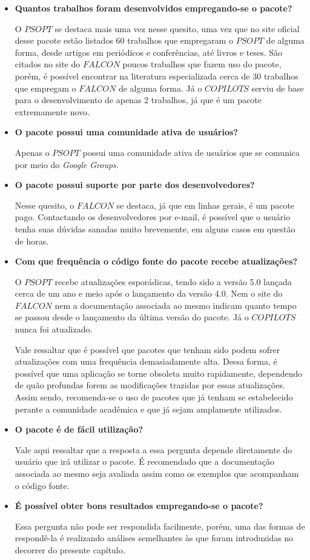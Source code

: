 \begin{itemize}
	\item \textbf{Quantos trabalhos foram desenvolvidos empregando-se o pacote? }
	
	O $ PSOPT $ se destaca mais uma vez nesse quesito, uma vez que no site oficial desse pacote estão listados 60 trabalhos que empregaram o $ PSOPT $ de alguma forma, desde artigos em periódicos e conferências, até livros e teses. São citados no site do $ FALCON $ poucos trabalhos que fazem uso do pacote, porém, é possível encontrar na literatura especializada cerca de 30 trabalhos que empregam o $ FALCON $ de alguma forma. Já o $ COPILOTS $ serviu de base para o desenvolvimento de apenas 2 trabalhos, já que é um pacote extremamente novo. 
	
	\item \textbf{O pacote possui uma comunidade ativa de usuários? }
	
	Apenas o $ PSOPT $ possui uma comunidade ativa de usuários que se comunica por meio do \textit{Google Groups}.
	
	\item \textbf{O pacote possui suporte por parte dos desenvolvedores?}
	
	Nesse quesito, o $ FALCON $ se destaca, já que em linhas gerais, é um pacote pago. Contactando os desenvolvedores por e-mail, é possível que o usuário tenha suas dúvidas sanadas muito brevemente, em alguns casos em questão de horas.
	
	\item \textbf{Com que frequência o código fonte do pacote recebe atualizações?}
	
	O $ PSOPT $ recebe atualizações esporádicas, tendo sido a versão 5.0 lançada cerca de um ano e meio após o lançamento da versão 4.0. Nem o site do $ FALCON $ nem a documentação associada ao mesmo indicam quanto tempo se passou desde o lançamento da última versão do pacote. Já o $ COPILOTS $ nunca foi atualizado.   
	
	Vale ressaltar que é possível que pacotes que tenham sido  podem sofrer atualizações com uma frequência demasiadamente alta. Dessa forma, é possível que uma aplicação se torne obsoleta muito rapidamente, dependendo de quão profundas forem as modificações trazidas por essas atualizações. Assim sendo, recomenda-se o uso de pacotes que já tenham se estabelecido perante a comunidade acadêmica e que já sejam amplamente utilizados. 
	
	\item \textbf{O pacote é de fácil utilização?}
	
	Vale aqui ressaltar que a resposta a essa pergunta depende diretamente do usuário que irá utilizar o pacote. É recomendado que a documentação associada ao mesmo seja avaliada assim como os exemplos que acompanham o código fonte. 
	
	\item \textbf{ É possível obter bons resultados empregando-se o pacote?}
	
	Essa pergunta não pode ser respondida facilmente, porém, uma das formas de respondê-la é realizando análises semelhantes às que foram introduzidas no decorrer do presente capítulo. 
	
\end{itemize}